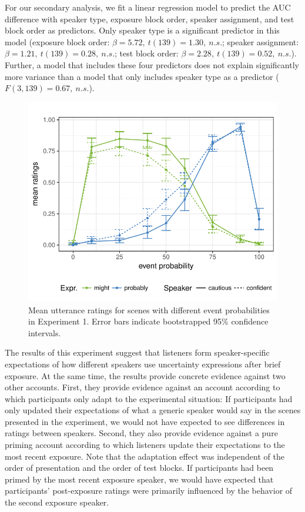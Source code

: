 For our secondary analysis, we fit a linear regression model to predict the AUC difference with speaker type, exposure block order, speaker assignment, and test block order as predictors. Only speaker type is a significant predictor in this model (exposure block order: $\beta=5.72, \ t(139)=1.30, \ n.s.$; speaker assignment: $\beta=1.21, \ t(139)=0.28, \ n.s.$; test block order:  $\beta=2.28, \ t(139)=0.52, \ n.s.$). Further, a model that includes these four predictors does not explain significantly more variance than a model that only includes speaker type as a predictor ($F(3,139)=0.67, \  n.s.$).

\begin{figure}
\includegraphics[width=\columnwidth]{plots/exp1-results.pdf}
\caption{Mean utterance ratings for scenes with different event probabilities in Experiment 1. Error bars indicate bootstrapped 95\% confidence intervals. \label{fig:exp1-results}}
\end{figure}

The results of this experiment suggest that listeners form speaker-specific expectations 
of how different speakers use uncertainty expressions after brief exposure. At the same time, the results provide
concrete evidence against two other accounts. First, they provide evidence against an account
according to which participants only adapt to the experimental situation: If participants had only updated 
their expectations of what a generic speaker would say in the scenes presented
in the experiment, we would not have expected to see differences in ratings between speakers. Second, they also 
provide evidence against a pure priming account according to which listeners update their expectations to the most 
recent exposure. Note that the adaptation effect was independent of the order of presentation 
and the order of test blocks. If participants had been primed by the most recent exposure speaker, we would have
expected that participants' post-exposure ratings were primarily influenced by the behavior of the second exposure speaker.


